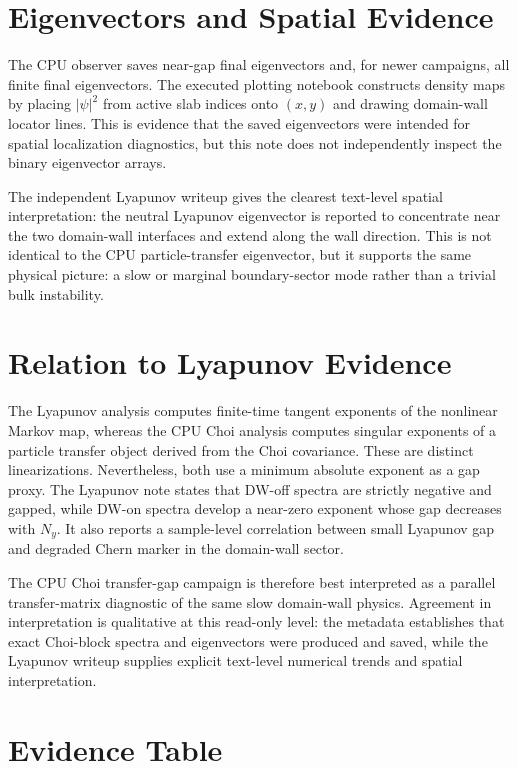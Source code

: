 \documentclass[aps,prb,onecolumn,nofootinbib,superscriptaddress]{revtex4-2}
\begin{document}
\section{Eigenvectors and Spatial Evidence}

The CPU observer saves near-gap final eigenvectors and, for newer campaigns, all
finite final eigenvectors.  The executed plotting notebook
constructs density maps by placing $|\psi|^2$ from active slab indices onto
$(x,y)$ and drawing domain-wall locator lines.  This is evidence that the saved
eigenvectors were intended for spatial localization diagnostics, but this note
does not independently inspect the binary eigenvector arrays.

The independent Lyapunov writeup gives the clearest text-level spatial
interpretation: the neutral Lyapunov eigenvector is reported to concentrate near
the two domain-wall interfaces and extend along the wall direction.  This is not
identical to the CPU particle-transfer eigenvector, but it supports the same
physical picture: a slow or marginal boundary-sector mode rather than a trivial
bulk instability.

\section{Relation to Lyapunov Evidence}

The Lyapunov analysis computes finite-time tangent exponents of the nonlinear
Markov map, whereas the CPU Choi analysis computes singular exponents of a
particle transfer object derived from the Choi covariance.  These are distinct
linearizations.  Nevertheless, both use a minimum absolute exponent as a gap
proxy.  The Lyapunov note states that DW-off spectra are strictly negative and
gapped, while DW-on spectra develop a near-zero exponent whose gap decreases
with $N_y$.  It also reports a sample-level correlation between small Lyapunov
gap and degraded Chern marker in the domain-wall sector.

The CPU Choi transfer-gap campaign is therefore best interpreted as a parallel
transfer-matrix diagnostic of the same slow domain-wall physics.  Agreement in
interpretation is qualitative at this read-only level: the metadata establishes
that exact Choi-block spectra and eigenvectors were produced and saved, while
the Lyapunov writeup supplies explicit text-level numerical trends and spatial
interpretation.

\section{Evidence Table}
\end{document}

